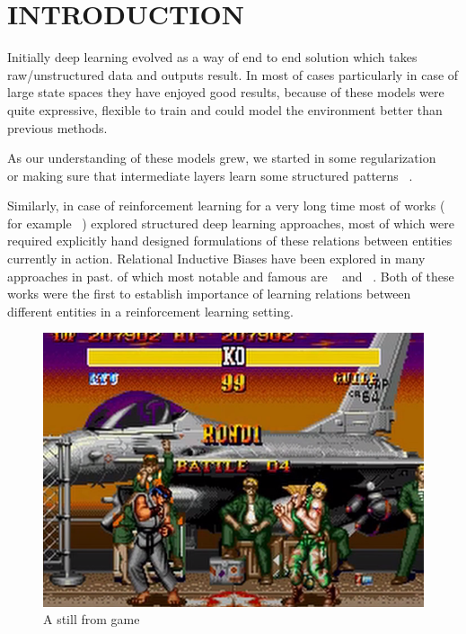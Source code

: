 \documentclass[english]{sobraep}
\begin{document}

\section{INTRODUCTION}

	Initially deep learning evolved as a way of end to end solution which takes raw/unstructured data and outputs result. In most of cases particularly in case of large state spaces they have enjoyed good results, because of these models were quite expressive, flexible to train and could model the environment better than previous methods. 
	
	As our understanding of these models grew, we started in some regularization ~\cite{DBLP:journals/corr/abs-1207-0580} or making sure that intermediate layers learn some structured patterns ~\cite{DBLP:journals/corr/RonnebergerFB15}.
	
	Similarly, in case of reinforcement learning for a very long time most of works ( for example ~\cite{DBLP:journals/corr/GarneloAS16}) explored structured deep learning approaches, most of which were required explicitly hand designed formulations of these relations between entities currently in action.  Relational Inductive Biases have been explored in many approaches in past.  of which most notable and famous are ~\cite{DBLP:journals/corr/abs-1806-01261} and ~\cite{zambaldi2018deep}. Both of these works were the first to establish importance of learning relations between different entities in a reinforcement learning setting.
	
\begin{figure}[H]
	\includegraphics[scale=.32]{game.png}
	\centering
	\caption{A still from game}
	\label{fig:fig1}
\end{figure}	
\end{document}
